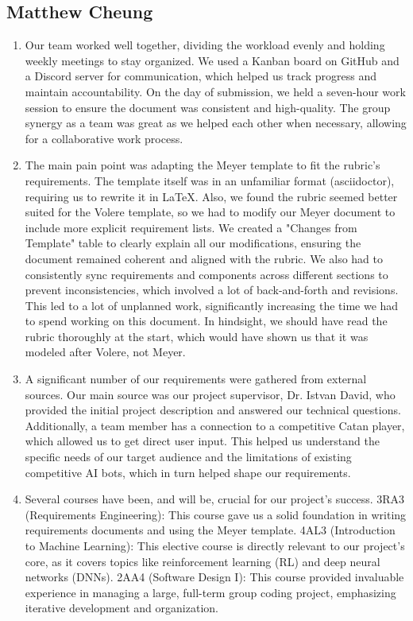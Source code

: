 \documentclass{article}
\begin{document}
\subsection*{Matthew Cheung}\label{subsec:matthew-cheung}
\begin{enumerate}
    \item
    Our team worked well together, dividing the workload evenly and holding weekly meetings to stay organized.
    We used a Kanban board on GitHub and a Discord server for communication, which helped us track progress and maintain accountability.
    On the day of submission, we held a seven-hour work session to ensure the document was consistent and high-quality.
    The group synergy as a team was great as we helped each other when necessary, allowing for a collaborative work process.

    \item The main pain point was adapting the Meyer template to fit the rubric's requirements.
    The template itself was in an unfamiliar format (asciidoctor), requiring us to rewrite it in LaTeX.
    Also, we found the rubric seemed better suited for the Volere template, so we had to modify our Meyer document to include more explicit requirement lists.
    We created a "Changes from Template" table to clearly explain all our modifications, ensuring the document remained coherent and aligned with the rubric.
    We also had to consistently sync requirements and components across different sections to prevent inconsistencies, which involved a lot of back-and-forth and revisions.
    This led to a lot of unplanned work, significantly increasing the time we had to spend working on this document.
    In hindsight, we should have read the rubric thoroughly at the start, which would have shown us that it was modeled after Volere, not Meyer.

    \item A significant number of our requirements were gathered from external sources.
    Our main source was our project supervisor, Dr. Istvan David, who provided the initial project description and answered our technical questions.
    Additionally, a team member has a connection to a competitive Catan player, which allowed us to get direct user input.
    This helped us understand the specific needs of our target audience and the limitations of existing competitive AI bots, which in turn helped shape our requirements.

    \item Several courses have been, and will be, crucial for our project's success.
    3RA3 (Requirements Engineering): This course gave us a solid foundation in writing requirements documents and using the Meyer template.
    4AL3 (Introduction to Machine Learning): This elective course is directly relevant to our project's core, as it covers topics like reinforcement learning (RL) and deep neural networks (DNNs).
    2AA4 (Software Design I): This course provided invaluable experience in managing a large, full-term group coding project, emphasizing iterative development and organization.


\end{enumerate}
\end{document}

